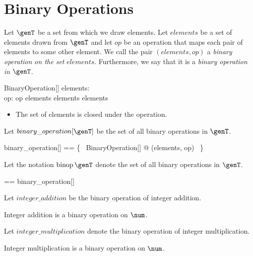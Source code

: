 \documentclass{amsart}
\begin{document}
\section{Binary Operations}

Let $\genT$ be a set from which we draw elements.
Let $elements$ be a set of elements drawn from $\genT$ and
let $op$ be an operation that maps each pair of elements to some other element.
We call the pair $(elements, op)$ a \textit{binary operation on the set} $elements$.
Furthermore, we say that it is a \textit{binary operation in} $\genT$.

\begin{schema}{BinaryOperation}[\genT]
	elements: \power \genT \\
	op: \genT \cross \genT \pfun \genT
\where
	op \in elements \cross elements \fun elements
\end{schema}
\begin{itemize}
	\item The set of elements is closed under the operation.
\end{itemize}

Let $binary\_operation[\genT]$ be the set of all binary operations in $\genT$.
\begin{zed}
	binary\_operation[\genT] == \{~ BinaryOperation[\genT] @ (elements, op) ~\}
\end{zed}

Let the notation $\binop \genT$ denote the set of all binary operations in $\genT$.
\begin{zed}
	\binop \genT == binary\_operation[\genT]
\end{zed}

Let $integer\_addition$ be the binary operation of integer addition.

\begin{example}
Integer addition is a binary operation on $\num$.
\end{example}

Let $integer\_multiplication$ denote the binary operation of integer multiplication.

\begin{example}
Integer multiplication is a binary operation on $\num$.
\end{example}
\end{document}
